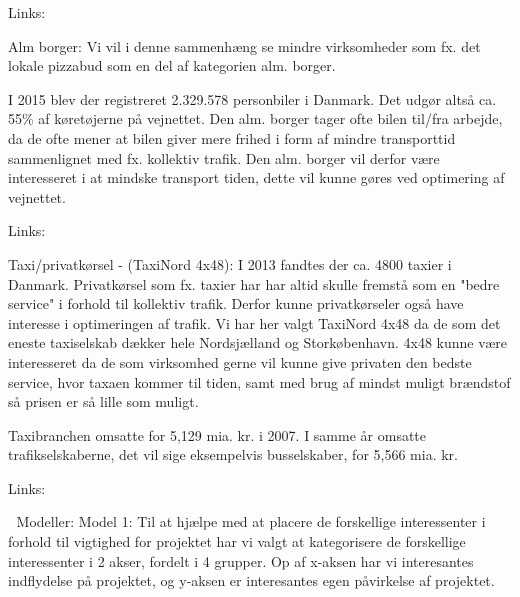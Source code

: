 Links:

Alm borger:
Vi vil i denne sammenhæng se mindre virksomheder som fx. det lokale pizzabud som en del af kategorien alm. borger.

I 2015 blev der registreret 2.329.578 personbiler i Danmark. Det udgør altså ca. 55\% af køretøjerne på vejnettet.
Den alm. borger tager ofte bilen til/fra arbejde, da de ofte mener at bilen giver mere frihed i form af mindre transporttid sammenlignet med fx. kollektiv trafik. Den alm. borger vil derfor være interesseret i at mindske transport tiden, dette vil kunne gøres ved optimering af vejnettet.


Links:



Taxi/privatkørsel - (TaxiNord 4x48):
I 2013 fandtes der ca. 4800 taxier i Danmark. Privatkørsel som fx. taxier har har altid skulle fremstå som en "bedre service" i forhold til kollektiv trafik. Derfor kunne privatkørseler også have interesse i optimeringen af trafik.
Vi har her valgt TaxiNord 4x48 da de som det eneste taxiselskab dækker hele Nordsjælland og Storkøbenhavn. 4x48 kunne være interesseret da de som virksomhed gerne vil kunne give privaten den bedste service, hvor taxaen kommer til tiden, samt med brug af mindst muligt brændstof så prisen er så lille som muligt.

Taxibranchen omsatte for 5,129 mia. kr. i 2007. I samme år omsatte trafikselskaberne, det vil sige eksempelvis busselskaber, for 5,566 mia. kr.

Links:




Modeller:
Model 1:
Til at hjælpe med at placere de forskellige interessenter i forhold til vigtighed for projektet har vi valgt at kategorisere de forskellige interessenter i 2 akser, fordelt i 4 grupper. Op af x-aksen har vi interesantes indflydelse på projektet, og y-aksen er interesantes egen påvirkelse af projektet.

